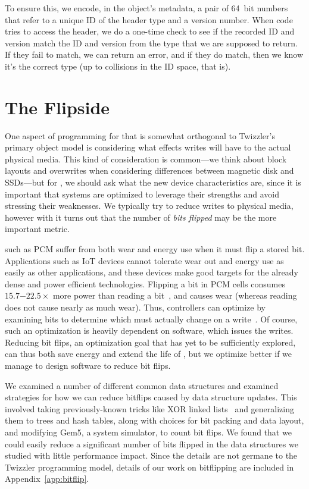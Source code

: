 To ensure this, we encode, in the object's metadata, a pair of 64~bit numbers that refer to a unique ID of the header
type and a version number. When code tries to access the header, we do a one-time check to see if the
recorded ID and version match the ID and version from the type that we are supposed to return. If they fail to match, we
can return an error, and if they do match, then we know it's the correct type (up to collisions in the ID space, that is).

\section{The Flipside}

One aspect of programming for \NVM that is somewhat orthogonal to Twizzler's primary object model is considering what
effects writes will have to the actual physical media. This kind of consideration is common---we think about block
layouts and overwrites when considering differences between magnetic disk and SSDs---but for \NVM, we should ask what
the new device characteristics are, since
it is important that systems are optimized to leverage their
strengths and avoid stressing their weaknesses. We typically try to reduce writes to physical media, however with
\NVM it turns out that the number of \emph{bits flipped} may be the more important metric.

\NVMs such as PCM suffer from both wear and energy use when it must flip a stored bit. Applications such as IoT devices
cannot tolerate wear out and energy use as easily as other applications, and these devices make good targets for the
already dense and power efficient \NVM technologies.
Flipping a bit in PCM cells consumes $15.7\mathit{-}22.5\times$ more power than reading a
bit~\cite{dhiman_pdram:_2009,lee_architecting_2009,xiangyu_dong_nvsim:_2012,qureshi_scalable_2009}, and causes wear
(whereas reading does not cause nearly as much wear).
Thus, controllers can optimize by examining bits to determine which must actually change on a write~\cite{yang:iscas07}.
Of course, such an optimization is heavily dependent on software, which issues the writes.
Reducing bit flips, an optimization goal that has yet to be
sufficiently explored, can thus both save energy and extend the life of \NVM, but we optimize better if we manage to
design software to reduce bit flips.

We examined a number of different common data structures and examined strategies for how we can reduce bitflips caused
by data structure updates. This involved taking previously-known tricks like XOR linked lists~\cite{xorll} and
generalizing them to trees and hash tables, along with choices for bit packing and data layout, and modifying Gem5, a
system simulator, to count bit flips. We found that we could easily reduce a significant number of bits flipped in the
data structures we studied with little performance impact. Since the details are not germane to the Twizzler programming
model, details of our work on bitflipping are included in Appendix~\ref{app:bitflip}.


